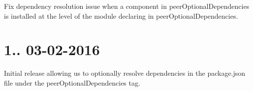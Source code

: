 
\begin{DoxyItemize}
\item Fix dependency resolution issue when a component in peer\+Optional\+Dependencies is installed at the level of the module declaring in peer\+Optional\+Dependencies.
\end{DoxyItemize}

\section*{1.. 03-\/02-\/2016 }


\begin{DoxyItemize}
\item Initial release allowing us to optionally resolve dependencies in the package.\+json file under the peer\+Optional\+Dependencies tag. 
\end{DoxyItemize}
